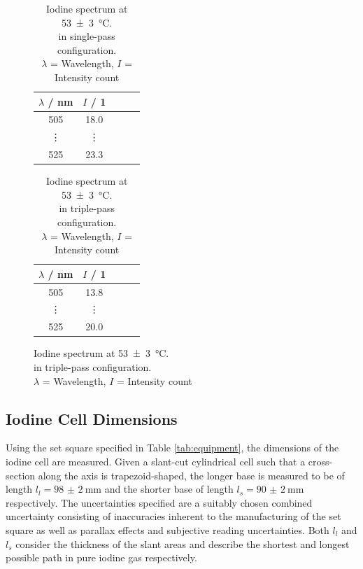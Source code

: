 \begin{figure}[H]
    \centering
    \begin{minipage}[b]{0.48\textwidth}
        \centering
        \begin{table}[H]
            \centering
            \caption{Iodine spectrum at \SI{53(3)}{\celsius}. \\in single-pass configuration. \\
            $\lambda$ = Wavelength, $I$ = Intensity count}
            \label{tab:execution:iodine:single:3}
            \begin{tabular}{ccccc}
            \hline
            $\lambda$ / nm & $I$ / 1 \\ \hline
            505  & 18.0  \\
            \vdots & \vdots  \\
            525 & 23.3 \\ \hline
            \end{tabular}
        \end{table}
    \end{minipage}
    \hfill
     \begin{minipage}[b]{0.48\textwidth}
        \centering
        \begin{table}[H]
            \centering
            \caption{Iodine spectrum at \SI{53(3)}{\celsius}. \\in triple-pass configuration. \\
            $\lambda$ = Wavelength, $I$ = Intensity count}
            \label{tab:execution:iodine:triple}
            \begin{tabular}{ccccc}
            \hline
            $\lambda$ / nm & $I$ / 1 \\ \hline
            505  & 13.8  \\
            \vdots & \vdots  \\
            525 & 20.0 \\ \hline
            \end{tabular}
        \end{table}
    \end{minipage}
\end{figure}

\subsection{Iodine Cell Dimensions}
\label{sec:execution:iodine-cell-dimensions}

Using the set square specified in Table \ref{tab:equipment}, the dimensions of the iodine cell are measured. Given a slant-cut cylindrical cell such that a cross-section along the axis is trapezoid-shaped, the longer base is measured to be of length $l_l = \SI{98(2)}{\mm}$ and the shorter base of length $l_s = \SI{90(2)}{\mm}$ respectively. The uncertainties specified are a suitably chosen combined uncertainty consisting of inaccuracies inherent to the manufacturing of the set square as well as parallax effects and subjective reading uncertainties. Both $l_l$ and $l_s$ consider the thickness of the slant areas and describe the shortest and longest possible path in pure iodine gas respectively.




